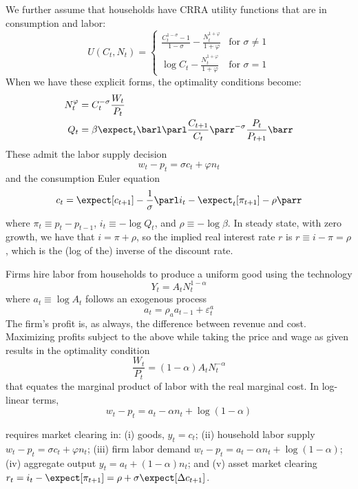\documentclass[10pt]{article}
\begin{document}
\begin{model}
We further assume that households have CRRA utility functions that are  in consumption and labor:
\[ U(C_t,N_t) = \begin{cases} \frac{C_t^{1-\sigma}-1}{1-\sigma} - \frac{N_t^{1+\varphi}}{1 + \varphi} & \text{for } \sigma \ne 1 \\ \log C_t - \frac{N_t^{1+\varphi}}{1 + \varphi} & \text{for } \sigma = 1\end{cases}\] When we have these explicit forms, the optimality conditions become: \begin{align*}
	N_t^\varphi &= C_t^{-\sigma} \frac{W_t}{P_t} \\ Q_t &= \beta \expect_t \barl \parl \frac{C_{t+1}}{C_t}\parr^{-\sigma} \frac{P_t}{P_{t+1}}\barr
\end{align*}
These admit the labor supply decision \[w_t - p_t = \sigma c_t + \varphi n_t\]and the consumption Euler equation \[c_t = \expect[ c_{t+1}] - \frac{1}{\sigma}\parl i_t - \expect_t [\pi_{t+1}] - \rho\parr\]where $\pi_t \equiv p_t - p_{t-1}$, $i_t \equiv -\log Q_t$, and $\rho \equiv -\log \beta$. In steady state, with zero growth, we have that $i = \pi + \rho$, so the implied real interest rate $r$ is $r \equiv i - \pi =\rho$, which is the (log of the) inverse of the discount rate.

Firms hire labor from households to produce a uniform good using the technology \[Y_t = A_t N_t^{1-\alpha}\]where $a_t \equiv \log A_t$ follows an exogenous process \[a_t = \rho_a a_{t-1} + \varepsilon_t^a\]The firm's profit is, as always, the difference between revenue and cost. Maximizing profits subject to the above while taking the price and wage as given results in the optimality condition \[\frac{W_t}{P_t} = (1-\alpha) A_t N_t^{-\alpha}\]that equates the marginal product of labor with the real marginal cost. In log-linear terms,\[w_t - p_t = a_t - \alpha n_t + \log(1-\alpha)\]
	
	
\begin{definition}
	 requires market clearing in: (i) goods, $y_t = c_t$; (ii) household labor supply $w_t - p_t = \sigma c_t + \varphi n_t$; (iii) firm labor demand $w_t - p_t = a_t - \alpha n_t + \log(1-\alpha)$; (iv) aggregate output $y_t = a_t + (1-\alpha)n_t$; and (v) asset market clearing $r_t = i_t - \expect[\pi_{t+1}] = \rho + \sigma \expect[\Delta c_{t+1}]$.
	

\end{definition}
\end{model}
\end{document}
